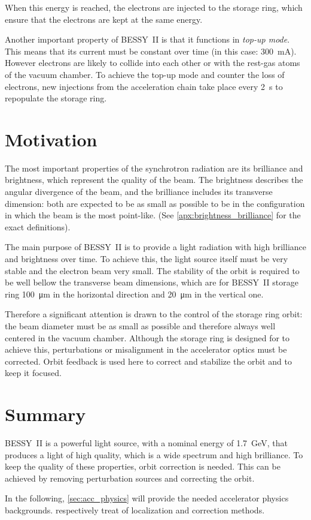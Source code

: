 When this energy is reached, the electrons are injected to the storage ring, which ensure that the electrons are kept at the same energy.

Another important property of BESSY~II is that it functions in \textit{top-up mode}. This means that its current must be constant over time (in this case: \SI{300}{\milli\ampere}). However electrons are likely to collide into each other or with the rest-gas atoms of the vacuum chamber. To achieve the top-up mode and counter the loss of electrons, new injections from the acceleration chain take place every 2~s to repopulate the storage ring.

\section{Motivation}
The most important properties of the synchrotron radiation are its brilliance and brightness, which represent the quality of the beam. The brightness describes the angular divergence of the beam, and the brilliance includes its transverse dimension: both are expected to be as small as possible to be in the configuration in which the beam is the most point-like. (See \cref{apx:brightness_brilliance} for the exact definitions).

The main purpose of BESSY~II is to provide a light radiation with high brilliance and brightness over time. To achieve this, the light source itself must be very stable and the electron beam very small. The stability of the orbit is required to be well bellow the transverse beam dimensions, which are for BESSY~II storage ring \SI{100}{\micro\meter} in the horizontal direction and \SI{20}{\micro\meter} in the vertical one.

Therefore a significant attention is drawn to the control of the storage ring orbit: the beam diameter must be as small as possible and therefore always well centered in the vacuum chamber. Although the storage ring is designed for to achieve this, perturbations or misalignment in the accelerator optics must be corrected. Orbit feedback is used here to correct and stabilize the orbit and to keep it focused.

\section{Summary}
BESSY~II is a powerful light source, with a nominal energy of \SI{1.7}{\giga\electronvolt}, that produces a light of high quality, which is a wide spectrum and high brilliance. To keep the quality of these properties, orbit correction is needed. This can be achieved by removing perturbation sources and correcting the orbit.

In the following, \cref{sec:acc_physics} will provide the needed accelerator physics backgrounds.  respectively treat of localization and correction methods.
